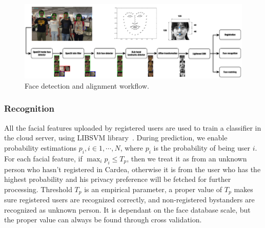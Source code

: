\begin{figure}[!htbp]
    \centering
    \includegraphics[width=1.0\textwidth]{figure/ch4-facedetalign.pdf}
    \caption{Face detection and alignment workflow.}
    \label{fig:ch4-facedetalign}
\end{figure}

\subsubsection{Recognition}
All the facial features uploaded by registered users are used to train a classifier in the cloud server, using LIBSVM library~\cite{chang2011libsvm}. During prediction, we enable probability estimations $p_i, i\in{1, \cdots, N}$, where $p_i$ is the probability of being user $i$. For each facial feature, if $\max_ip_i \leq T_p$, then we treat it as from an unknown person who hasn't registered in Cardea, otherwise it is from the user who has the highest probability and his privacy preference will be fetched for further processing. Threshold $T_p$ is an empirical parameter, a proper value of $T_p$ makes sure registered users are recognized correctly, and non-registered bystanders are recognized as unknown person. It is dependant on the face database scale, but the proper value can always be found through cross validation.

